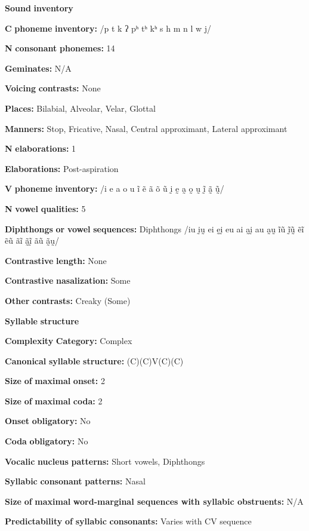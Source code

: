\textbf{Sound} \textbf{inventory}

\textbf{C} \textbf{phoneme} \textbf{inventory:} /p t k ʔ pʰ tʰ kʰ s h m n l w j/

\textbf{N} \textbf{consonant} \textbf{phonemes:} 14

\textbf{Geminates:} N/A

\textbf{Voicing} \textbf{contrasts:} None

\textbf{Places:} Bilabial, Alveolar, Velar, Glottal

\textbf{Manners:} Stop, Fricative, Nasal, Central approximant, Lateral approximant

\textbf{N} \textbf{elaborations:} 1

\textbf{Elaborations:} Post-aspiration

\textbf{V} \textbf{phoneme} \textbf{inventory:} /i e a o u ĩ ẽ ã õ ũ ḭ ḛ a̰ o̰ ṵ ḭ̃ ã̰ ṵ̃/

\textbf{N} \textbf{vowel} \textbf{qualities:} 5

\textbf{Diphthongs} \textbf{or} \textbf{vowel} \textbf{sequences:} Diphthongs /iu ḭṵ ei ḛḭ eu ai a̰ḭ au a̰ṵ ĩũ ḭ̃ṵ̃ ẽĩ ẽũ ãĩ ã̰ḭ̃ ãũ ã̰ṵ/

\textbf{Contrastive} \textbf{length:} None

\textbf{Contrastive} \textbf{nasalization:} Some

\textbf{Other} \textbf{contrasts:} Creaky (Some)

\textbf{Syllable} \textbf{structure}

\textbf{Complexity} \textbf{Category:} Complex

\textbf{Canonical} \textbf{syllable} \textbf{structure:} (C)(C)V(C)(C) \citep[124-34]{Eberhard2009}

\textbf{Size} \textbf{of} \textbf{maximal} \textbf{onset:} 2

\textbf{Size} \textbf{of} \textbf{maximal} \textbf{coda:} 2

\textbf{Onset} \textbf{obligatory:} No

\textbf{Coda} \textbf{obligatory:} No

\textbf{Vocalic} \textbf{nucleus} \textbf{patterns:} Short vowels, Diphthongs

\textbf{Syllabic} \textbf{consonant} \textbf{patterns:} Nasal

\textbf{Size} \textbf{of} \textbf{maximal} \textbf{word{}-marginal sequences with syllabic obstruents:} N/A

\textbf{Predictability} \textbf{of} \textbf{syllabic} \textbf{consonants:} Varies with CV sequence

